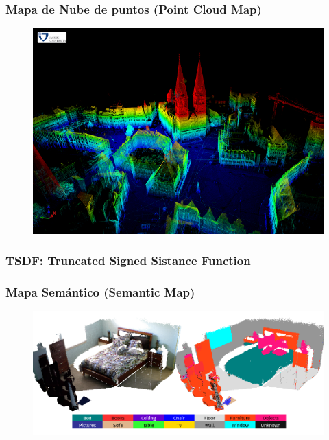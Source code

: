 \begin{frame}
    \frametitle{Mapa de Nube de puntos (Point Cloud Map)}
    
    
   	\begin{figure}
    	\includegraphics[width=0.6\columnwidth]{./images/point_cloud_map_bremen_city.png}
    \end{figure}
    
\end{frame}

\begin{frame}
    \frametitle{TSDF: Truncated Signed Sistance Function}
   
    
\end{frame}


\begin{frame}
	\frametitle{Mapa Semántico (Semantic Map)}
	
   	\begin{figure}
    	\includegraphics[width=0.8\columnwidth]{./images/semantic_map_semanticfusion.png}
	\end{figure}
	
\end{frame}



